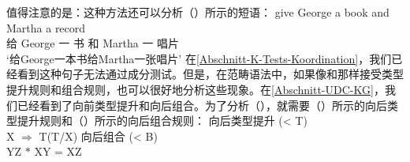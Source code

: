 \begin{exe}
\begin{xlist}[iv.]
\begin{exe}
\begin{xlist}[iv.]
值得注意的是：这种方法还可以分析（）所示的短语：
\ea
\label{Beispiel-Gapping-Steedman}
\gll give George a book and Martha a record\\
     给 George 一 书 和 Martha 一 唱片\\
\glt `给George一本书给Martha一张唱片'
\z
在\ref{Abschnitt-K-Tests-Koordination}，我们已经看到这种句子无法通过成分测试。但是，在范畴语法中，如果像\citet{Dowty88a-u}和\citet{Steedman91a}那样接受类型提升规则和组合规则，也可以很好地分析这些现象。在\ref{Abschnitt-UDC-KG}，我们已经看到了向前类型提升和向后组合。为了分析（），就需要（）所示的向后类型提升规则和（）所示的向后组合规则：
\ea
向后类型提升 (< T)\\
X $\Rightarrow$ T\bs (T/X)
\z
\ea
向后组合 (< B)\\
    Y\bs Z $*$ X\bs Y = X\bs Z
\z


\end{xlist}
\end{exe}
\end{xlist}
\end{exe}
